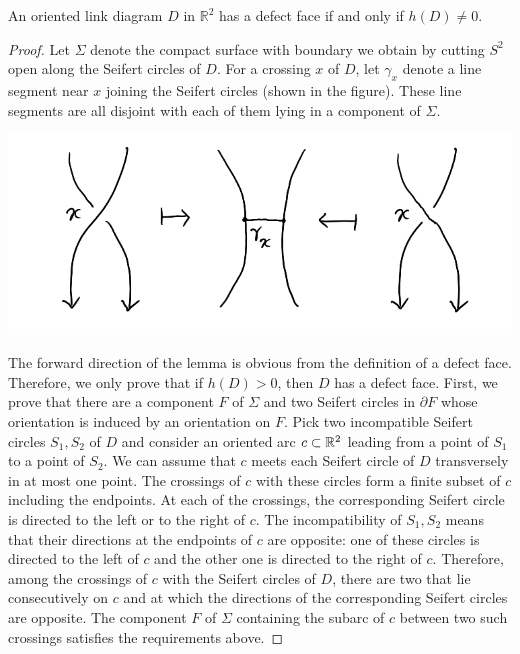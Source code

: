 \begin{lemma}
  \label{l2}
An oriented link diagram $D$ in $\mathbb{R}^2$ has a defect face if and only if $h(D) \ne 0$.
\end{lemma}

\begin{proof}
  Let $\Sigma$ denote the compact surface with boundary we obtain by cutting $S^2$ open along the Seifert circles of $D$. For a crossing $x$ of $D$, let $\gamma_x$ denote a line segment near $x$ joining the Seifert circles (shown in the figure). These line segments are all disjoint with each of them lying in a component of $\Sigma$.

\begin{center}
 \includegraphics[scale=.25]{images/4.png}
\end{center}
  
  The forward direction of the lemma is obvious from the definition of a defect face. Therefore, we only prove that if $h(D) > 0$, then $D$ has a defect face. First, we prove that there are a component $F$ of $\Sigma$ and two Seifert circles in $\partial F$ whose orientation is induced by an orientation on $F$. Pick two incompatible Seifert circles $S_1, S_2$ of $D$ and consider an oriented arc $c \subset \mathbb{R}^2$ leading from a point of $S_1$ to a point of $S_2$. We can assume that $c$ meets each Seifert circle of $D$ transversely in at most one point. The crossings of $c$ with these circles form a ﬁnite subset of $c$ including the endpoints. At each of the crossings, the corresponding Seifert circle is directed to the left or to the right of $c$. The incompatibility of $S_1, S_2$ means that their directions at the endpoints of $c$ are opposite: one of these circles is directed to the left of $c$ and the other one is directed to the right of $c$. Therefore, among the crossings of $c$ with the Seifert circles of $D$, there are two that lie consecutively on $c$ and at which the directions of the corresponding
  Seifert circles are opposite. The component $F$ of $\Sigma$ containing the subarc of $c$ between two such crossings satisﬁes the requirements above.


\end{proof}
